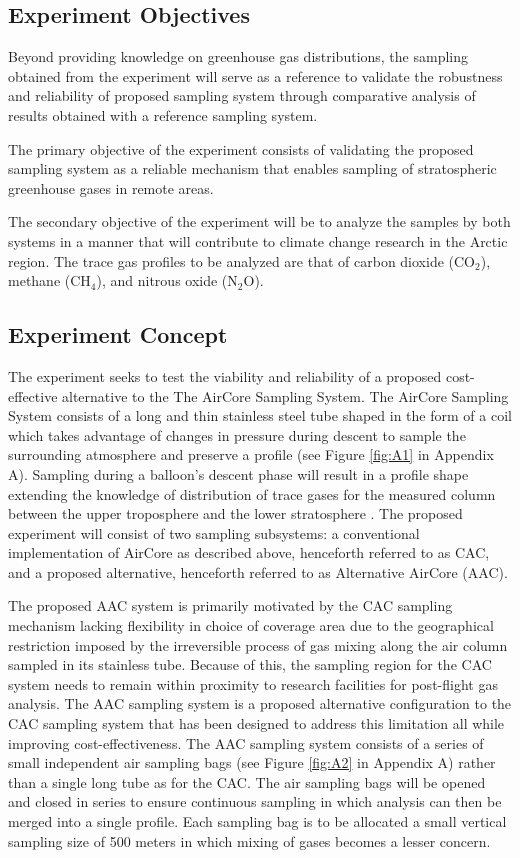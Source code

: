 \documentclass[a4paper,12pt,twoside]{article}
\begin{document}
\subsection{Experiment Objectives}

Beyond providing knowledge on greenhouse gas distributions, the sampling obtained from the experiment will serve as a reference to validate the robustness and reliability of proposed sampling system through comparative analysis of results obtained with a reference sampling system.

The primary objective of the experiment consists of validating the proposed sampling system as a reliable mechanism that enables sampling of stratospheric greenhouse gases in remote areas.

The secondary objective of the experiment will be to analyze the samples by both systems in a manner that will contribute to climate change research in the Arctic region. The trace gas profiles to be analyzed are that of carbon dioxide (CO$_{2}$), methane (CH$_{4}$), and nitrous oxide (N$_{2}$O). 
\subsection{Experiment Concept}

The experiment seeks to test the viability and reliability of a proposed cost-effective alternative to the The AirCore Sampling System. The AirCore Sampling System consists of a long and thin stainless steel tube shaped in the form of a coil which takes advantage of changes in pressure during descent to sample the surrounding atmosphere and preserve a profile (see Figure \ref{fig:A1} in Appendix A). Sampling during a balloon’s descent phase will result in a profile shape extending the knowledge of distribution of trace gases for the measured column between the upper troposphere and the lower stratosphere \cite{Karion}. The proposed experiment will consist of two sampling subsystems: a conventional implementation of AirCore as described above, henceforth referred to as CAC, and a proposed alternative, henceforth referred to as Alternative AirCore (AAC).

The proposed AAC system is primarily motivated by the CAC sampling mechanism lacking flexibility in choice of coverage area due to the geographical restriction imposed by the irreversible process of gas mixing along the air column sampled in its stainless tube. Because of this, the sampling region for the CAC system needs to remain within proximity to research facilities for post-flight gas analysis. The AAC sampling system is a proposed alternative configuration to the CAC sampling system that has been designed to address this limitation all while improving cost-effectiveness. The AAC sampling system consists of a series of small independent air sampling bags (see Figure \ref{fig:A2} in Appendix A) rather than a single long tube as for the CAC. The air sampling bags will be opened and closed in series to ensure continuous sampling in which analysis can then be merged into a single profile. Each sampling bag is to be allocated a small vertical sampling size of 500 meters in which mixing of gases becomes a lesser concern.
\end{document}
